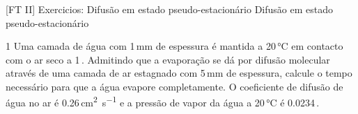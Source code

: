 \documentclass[\mainfilename]{subfiles}
\begin{document}

[FT II]
{Exercicios: Difusão em estado pseudo-estacionário} %
{Difusão em estado pseudo-estacionário} %


\begin{questionBox}1{ %
    Uma camada de água com 1\,\unit{\milli\metre} de espessura é mantida a 20\,\unit{\celsius} em contacto com o ar seco a 1\,\unit{\atm}. Admitindo que a evaporação se dá por difusão molecular através de uma camada de ar estagnado com 5\,\unit{\milli\metre} de espessura, calcule o tempo necessário para que a água evapore completamente. O coeficiente de difusão de água no ar é 0.26\,\unit{\centi\metre^2.\second^{-1}} e a pressão de vapor da água a 20\,\unit{\celsius} é 0.0234\,\unit{\atm}.
} %
    
\end{questionBox}
\end{document}
